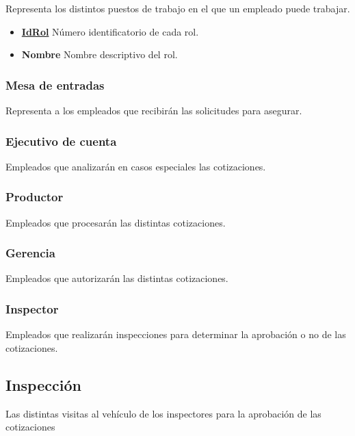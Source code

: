 \documentclass[a4paper,11pt]{article}
\begin{document}
Representa los distintos puestos de trabajo en el que un empleado puede trabajar.

\begin{itemize}
   
  \item \textbf{\uline{IdRol}} Número identificatorio de cada rol.
  
  \item \textbf{Nombre} Nombre descriptivo del rol.
  
\end{itemize}

\subsubsection{Mesa de entradas}

Representa a los empleados que recibirán las solicitudes para asegurar.

\subsubsection{Ejecutivo de cuenta}

Empleados que analizarán en casos especiales las cotizaciones.

\subsubsection{Productor}

Empleados que procesarán las distintas cotizaciones.

\subsubsection{Gerencia}

Empleados que autorizarán las distintas cotizaciones.

\subsubsection{Inspector}

Empleados que realizarán inspecciones para determinar 
la aprobación o no de las cotizaciones.

\subsection{Inspección}

Las distintas visitas al vehículo de los inspectores para la 
aprobación de las cotizaciones
\end{document}

